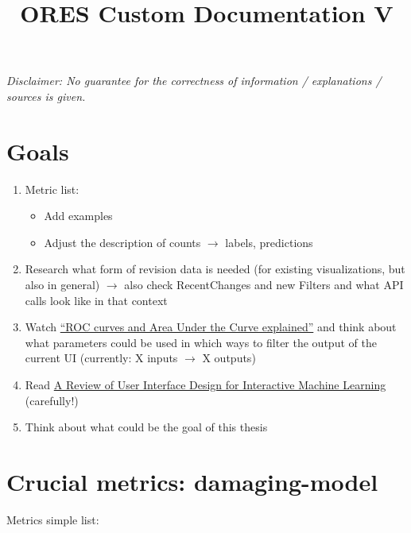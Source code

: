 \documentclass[12pt,a4paper]{article}
\title{ORES Custom Documentation V}
\date{}
\begin{document}
\maketitle
\textit{Disclaimer: No guarantee for the correctness of information / explanations / sources is given.}\\
%
\section*{Goals}
\begin{enumerate}
\item Metric list:
\begin{itemize}
\item Add examples
\item Adjust the description of counts $\rightarrow$ labels, predictions
\end{itemize}
\item Research what form of revision data is needed (for existing visualizations, but also in general) $\rightarrow$ also check RecentChanges and new Filters and what API calls look like in that context
\item Watch \href{https://www.dataschool.io/roc-curves-and-auc-explained}{``ROC curves and Area Under the Curve explained''} and think about what parameters could be used in which ways to filter the output of the current UI (currently: X inputs $\rightarrow$ X outputs)
\item Read \href{https://doi.org/10.1145/3185517}{A Review of User Interface Design for Interactive Machine Learning} (carefully!)
\item Think about what could be the goal of this thesis
\end{enumerate}
%
%
%
\newpage
\section{Crucial metrics: \textbf{damaging}-model}
Metrics simple list:\\
\end{document}
